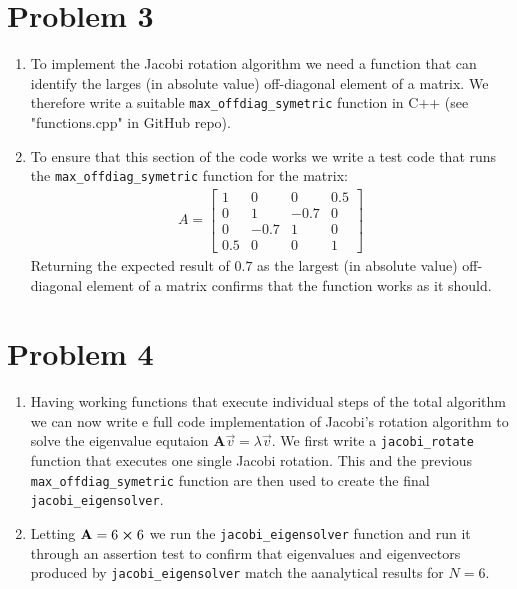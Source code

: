 \documentclass[english,notitlepage]{revtex4-1}  %
\begin{document}
\section*{Problem 3}
\begin{enumerate}[label= \alph*)]
    \item
    To implement the Jacobi rotation algorithm we need a function that can identify the larges (in absolute value)
    off-diagonal element of a matrix. We therefore write a suitable \texttt{max\_offdiag\_symetric} function in C++ (see "functions.cpp" in GitHub repo).

    \item
    To ensure that this section of the code works we write a test code that runs the \texttt{max\_offdiag\_symetric} function
    for the matrix:
    \begin{align*}
        A = \begin{bmatrix}
            1 & 0 & 0 & 0.5 \\
            0 & 1 & -0.7 & 0 \\
            0 & -0.7 & 1 & 0 \\
            0.5 & 0 & 0 & 1
        \end{bmatrix}
    \end{align*}
    Returning the expected result of $0.7$ as the largest (in absolute value)
    off-diagonal element of a matrix confirms that the function works as it should.
\end{enumerate}

\section*{Problem 4}
\begin{enumerate}[label= \alph*)]
    \item Having working functions that execute individual steps of the total algorithm we can
    now write e full code implementation of Jacobi's rotation algorithm to solve the eigenvalue
    equtaion $\textbf{A} \vec{v} = \lambda \vec{v}$. We first write a \texttt{jacobi\_rotate}
    function that executes one single Jacobi rotation. This and the previous \texttt{max\_offdiag\_symetric}
    function are then used to create the final \texttt{jacobi\_eigensolver}.
    \item Letting $\textbf{A} = 6 \cross 6$ we run the \texttt{jacobi\_eigensolver} function and run
    it through an assertion test to confirm that eigenvalues and eigenvectors produced by \texttt{jacobi\_eigensolver}
    match the aanalytical results for $N = 6$.
\end{enumerate}
\end{document}

